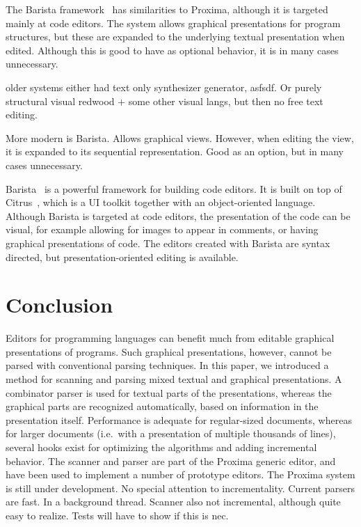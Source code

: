 \documentclass[12pt]{article}
\begin{document}
The Barista framework~\cite{KoMyers06Barista} has similarities to Proxima, although it is targeted mainly at code editors. The system allows graphical presentations for program structures, but these are expanded to the underlying textual presentation when edited. Although this is good to have as optional behavior, it is in many cases unnecessary.

\bc
older systems either had text only synthesizer generator, asfsdf. Or purely structural visual redwood + some other visual langs, but then no free text editing.


More modern is Barista. Allows graphical views. However, when editing the view, it is expanded to its sequential representation. Good as an option, but in many cases unnecessary. 



\noindent Barista~\cite{KoMyers06Barista} is a powerful framework for building code editors. It is built on top of Citrus~\cite{KoMyers05Citrus}, which is a UI toolkit together with an object-oriented language. Although Barista is targeted at code editors, the presentation of the code can be visual, for example allowing for images to appear in comments, or having graphical presentations of code. The editors created with Barista are syntax directed, but presentation-oriented editing is available. 

\ec



%
\section{Conclusion}\label{sect:conclusion}
%


Editors for programming languages can benefit much from editable graphical presentations of programs. Such graphical presentations, however, cannot be parsed with conventional parsing techniques. In this paper, we introduced a method for scanning and parsing mixed textual and graphical presentations. A combinator parser is used for textual parts of the presentations, whereas the graphical parts are recognized automatically, based on information in the presentation itself. Performance is adequate for regular-sized documents, whereas for larger documents (i.e.\ with a presentation of multiple thousands of lines), several hooks exist for optimizing the algorithms and adding incremental behavior. The scanner and parser are part of the Proxima generic editor, and have been used to implement a number of prototype editors.
\bc
The Proxima system is still under development. No special attention to incrementality. Current parsers are fast. In a background thread. Scanner also not incremental, although quite easy to realize. Tests will have to show if this is nec.
\end{document}

